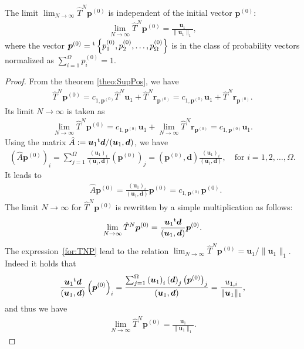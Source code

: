 \begin{theorem}
	The limit $\lim_{N\to\infty}\hat{T}^{N}\bm{p}^{(0)}$ is independent of the initial vector $\bm{p}^{(0)}$:
	\begin{align}
	\lim_{N\to\infty}\hat{T}^{N}\bm{p}^{(0)} = \frac{\bm{u}_{1}}{\|\bm{u}_{1}\|_{1}},
	\end{align}
	where the vector $\bm{p}^{(0)}={}^{\rm t}\left\{p^{(0)}_{1}, p^{(0)}_{2}, \dots, p^{(0)}_{\Omega}\right\}$ is in the class of probability vectors normalized as $\sum_{i=1}^{\Omega}p^{(0)}_{i} = 1$.
\end{theorem}

\begin{proof}
	From the theorem \ref{theo:SupPos}, we have
	\begin{align}
	\hat{T}^{N}\bm{p}^{(0)} = c_{1,\bm{p}^{(0)}}\hat{T}^{N}\bm{u}_{1} + \hat{T}^{N}\bm{r}_{\bm{p}^{(0)}} = c_{1,\bm{p}^{(0)}}\bm{u}_{1} + \hat{T}^{N}\bm{r}_{\bm{p}^{(0)}}.
	\end{align}
	Its limit $N\to\infty$ is taken as
	\begin{align}
	\lim_{N\to\infty}\hat{T}^{N}\bm{p}^{(0)} = c_{1,\bm{p}^{(0)}}\bm{u}_{1} + \lim_{N\to\infty}\hat{T}^{N}\bm{r}_{\bm{p}^{(0)}} = c_{1,\bm{p}^{(0)}}\bm{u}_{1}.
	\end{align}
	Using the matrix $\hat{A}:=\bm{u}_{1}{}^{\rm t}\bm{d}/(\bm{u}_{1},\bm{d})$, we have
	\begin{align}
	\left(\hat{A}\bm{p}^{(0)}\right)_{i} = \sum_{j = 1}^{\Omega}\frac{\left(\bm{u}_{1}\right)_{i}}{(\bm{u}_{1},\bm{d})}\left(\bm{p}^{(0)}\right)_{j} = \left(\bm{p}^{(0)},\bm{d}\right)\frac{\left(\bm{u}_{1}\right)_{i}}{(\bm{u}_{1},\bm{d})},\quad\text{for $i=1,2,\dots,\Omega$}.
	\end{align}
	It leads to
	\begin{align}
	& \hat{A}\bm{p}^{(0)} = \frac{\left(\bm{u}_{1}\right)_{i}}{(\bm{u}_{1},\bm{d})}\bm{p}^{(0)} = c_{1,\bm{p}^{(0)}}\bm{p}^{(0)}.
	\end{align}
	The limit $N\to\infty$ for $\hat{T}^{N}\bm{p}^{(0)}$ is rewritten by a simple multiplication as follows:
	\begin{align}
	\lim_{N\to\infty}\hat{T}^{N}\bm{p}^{(0)} = \frac{\bm{u}_{1}{}^{\rm t}\bm{d}}{(\bm{u}_{1},\bm{d})}\bm{p}^{(0)}.\label{for:TNP}
	\end{align}
	The expression~\eqref{for:TNP} lead to the relation $\lim_{N\to\infty}\hat{T}^{N}\bm{p}^{(0)} = \bm{u}_{1}/\|\bm{u}_{1}\|_{1}$. Indeed it holds that
	\begin{align}
	\frac{\bm{u}_{1}{}^{\rm t}\bm{d}}{(\bm{u}_{1},\bm{d})}\left(\bm{p}^{(0)}\right)_{i} = \frac{\sum_{j=1}^{\Omega}\left(\bm{u}_{1}\right)_{i}\left(\bm{d}\right)_{j}\left(\bm{p}^{(0)}\right)_{j}}{(\bm{u}_{1},\bm{d})} = \frac{u_{1,i}}{\|\bm{u}_{1}\|_{1}},
	\end{align}
	and thus we have
	\begin{align}
	\lim_{N\to\infty}\hat{T}^{N}\bm{p}^{(0)} = \frac{\bm{u}_{1}}{\|\bm{u}_{1}\|_{1}}.
	\end{align}
\end{proof}

